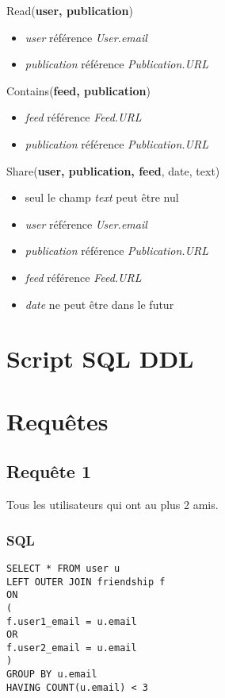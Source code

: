 \documentclass[a4paper,10pt]{article}
\begin{document}
        Read(\textbf{user, publication})
        \begin{itemize}            
            \item \textit{user} référence \textit{User.email}
            \item \textit{publication} référence \textit{Publication.URL}
        \end{itemize}
            
        Contains(\textbf{feed, publication})
        \begin{itemize}            
            \item \textit{feed} référence \textit{Feed.URL}
            \item \textit{publication} référence \textit{Publication.URL}
        \end{itemize}
            
        Share(\textbf{user, publication, feed}, date, text)
        \begin{itemize}
			\item seul le champ \textit{text} peut être nul
            \item \textit{user} référence \textit{User.email}
            \item \textit{publication} référence \textit{Publication.URL}
            \item \textit{feed} référence \textit{Feed.URL}
            \item \textit{date} ne peut être dans le futur
        \end{itemize}
		
\section{Script SQL DDL}
		
\section{Requêtes}
\subsection{Requête 1}
Tous les utilisateurs qui ont au plus 2 amis.
\subsubsection{SQL}
\begin{lstlisting}
SELECT * FROM user u
LEFT OUTER JOIN friendship f
ON
(
f.user1_email = u.email
OR
f.user2_email = u.email
)
GROUP BY u.email
HAVING COUNT(u.email) < 3
\end{lstlisting}
\end{document}
